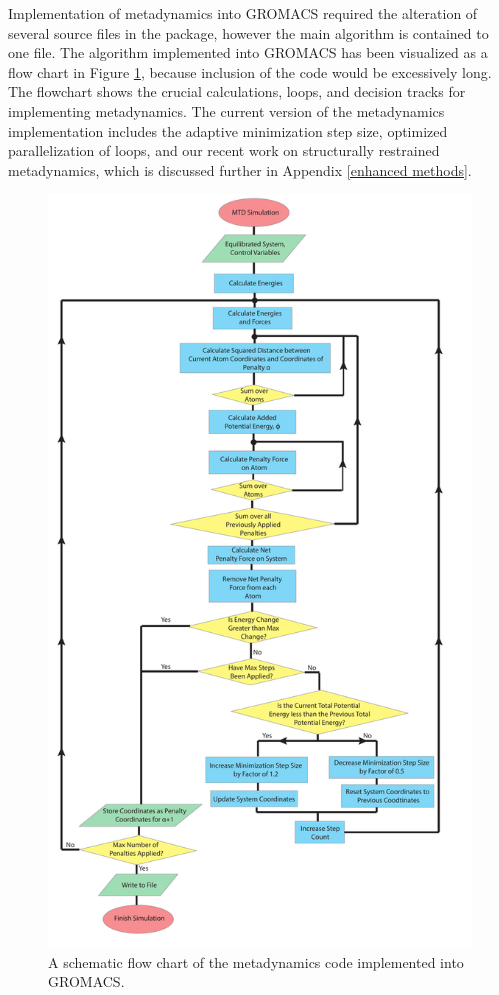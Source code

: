 Implementation of metadynamics into GROMACS required the alteration of several source files in the package, however the main algorithm is contained to one file. The algorithm implemented into GROMACS has been visualized as a flow chart in Figure \ref{flowchart}, because inclusion of the code would be excessively long.  The flowchart shows the crucial calculations, loops, and decision tracks for implementing metadynamics.  The current version of the metadynamics implementation includes the adaptive minimization step size, optimized parallelization of loops, and our recent work on structurally restrained metadynamics, which is discussed further in Appendix \ref{enhanced methods}.
\begin{figure}
	\centering
	\includegraphics[height=.95\textheight]{./Figures/Appendix/MTD_flowchart.pdf}
	\caption{A schematic flow chart of the metadynamics code implemented into GROMACS.}
	\label{flowchart}
\end{figure}